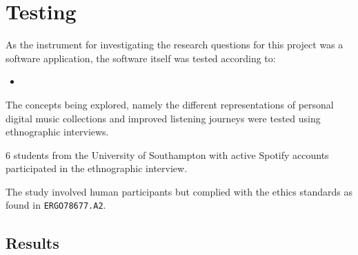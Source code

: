 \chapter{Testing}
As the instrument for investigating the research questions for this project was a software application, the software itself was tested according to:\begin{itemize} %
    \item 
\end{itemize}

The concepts being explored, namely the different representations of personal digital music collections and improved listening journeys were tested using ethnographic interviews.

6 students from the University of Southampton with active Spotify accounts participated in the ethnographic interview.

The study involved human participants but complied with the ethics standards as found in \lstinline|ERGO78677.A2|.



\section{Results}
